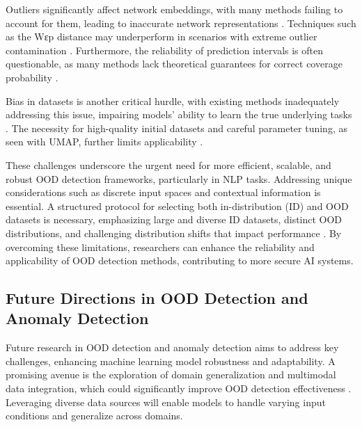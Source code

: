 Outliers significantly affect network embeddings, with many methods failing to account for them, leading to inaccurate network representations \cite{bandyopadhyay2018outlierawarenetworkembedding}. Techniques such as the Wεp distance may underperform in scenarios with extreme outlier contamination \cite{nietert2023outlierrobustoptimaltransportduality}. Furthermore, the reliability of prediction intervals is often questionable, as many methods lack theoretical guarantees for correct coverage probability \cite{ramosaj2021interpretablemachinesconstructingvalid}.

Bias in datasets is another critical hurdle, with existing methods inadequately addressing this issue, impairing models' ability to learn the true underlying tasks \cite{li2019repairremovingrepresentationbias}. The necessity for high-quality initial datasets and careful parameter tuning, as seen with UMAP, further limits applicability \cite{islam2024outlierdetectionlargeradiological}.

These challenges underscore the urgent need for more efficient, scalable, and robust OOD detection frameworks, particularly in NLP tasks. Addressing unique considerations such as discrete input spaces and contextual information is essential. A structured protocol for selecting both in-distribution (ID) and OOD datasets is necessary, emphasizing large and diverse ID datasets, distinct OOD distributions, and challenging distribution shifts that impact performance \cite{wang2024bridgingooddetectiongeneralization,lang2023survey,yuan2023revisiting}. By overcoming these limitations, researchers can enhance the reliability and applicability of OOD detection methods, contributing to more secure AI systems.


\subsection{Future Directions in OOD Detection and Anomaly Detection} \label{subsec:Future Directions in OOD Detection and Anomaly Detection}

Future research in OOD detection and anomaly detection aims to address key challenges, enhancing machine learning model robustness and adaptability. A promising avenue is the exploration of domain generalization and multimodal data integration, which could significantly improve OOD detection effectiveness \cite{lang2023survey}. Leveraging diverse data sources will enable models to handle varying input conditions and generalize across domains.

